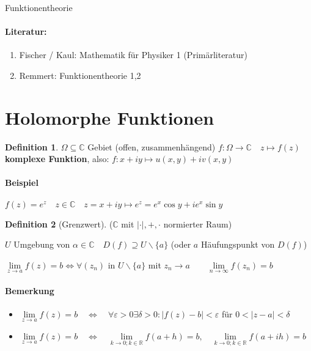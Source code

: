 \documentclass[ngerman,halfparskip]{scrartcl}
\theoremstyle{definition}
\newtheorem{defin}{Definition}[section]
\def\R{\mathbb R}
\def\C{\mathbb C}
\begin{document}
\huge Funktionentheorie \normalsize
\paragraph{Literatur:} 
\begin{enumerate}
\item Fischer / Kaul: Mathematik für Physiker 1 (Primärliteratur)
\item Remmert: Funktionentheorie 1,2
\end{enumerate}

\section{Holomorphe Funktionen}
\begin{defin}
$\Omega \subseteq \C$ Gebiet (offen, zusammenhängend) $f:\Omega \rightarrow \C \quad z\mapsto f(z)$ \textbf{komplexe Funktion}, also: $f:x+iy\mapsto u(x,y)+iv(x,y)$
\end{defin}
\paragraph*{Beispiel} $f(z)=e^z \quad z\in\C \quad z=x+iy\mapsto e^z=e^x\cos y +ie^x \sin y$

\begin{defin}[Grenzwert] ($\C$ mit $|\cdot|,+,\cdot$ normierter Raum)

$U$ Umgebung von $\alpha \in\C\quad D(f)\supseteq U \backslash \{a\}$ (oder $a$ Häufungspunkt von $D(f)$)

$\lim\limits_{ z\rightarrow a} f(z)=b \Leftrightarrow \forall (z_n)$ in $U \backslash \{a\}$ mit $z_n\rightarrow a \qquad \lim\limits_{ n\rightarrow \infty}f(z_n)=b$

\end{defin}

\paragraph*{Bemerkung} \begin{itemize}
\item $\lim\limits_{ z\rightarrow a} f(z)=b \quad\Leftrightarrow\quad \forall \varepsilon >0 \exists \delta >0: |f(z)-b|<\varepsilon$ für $0<|z-a|<\delta$
\item $\lim\limits_{ z\rightarrow a} f(z)=b \quad\Leftrightarrow\quad \lim\limits_{k\rightarrow 0; k\in\R} f(a+h)=b, \quad \lim\limits_{k\rightarrow 0; k\in\R} f(a+ih)=b$
\end{itemize}
\end{document}
